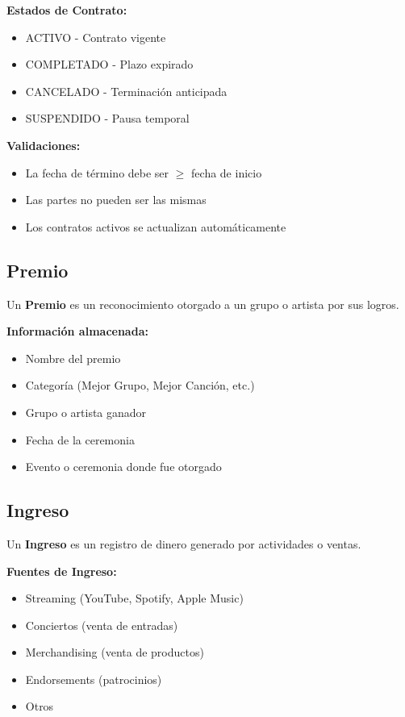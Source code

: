 \documentclass[12pt,a4paper,spanish,oneside]{report}
\begin{document}
\textbf{Estados de Contrato:}
\begin{itemize}
\item ACTIVO - Contrato vigente
\item COMPLETADO - Plazo expirado
\item CANCELADO - Terminación anticipada
\item SUSPENDIDO - Pausa temporal
\end{itemize}

\textbf{Validaciones:}
\begin{itemize}
\item La fecha de término debe ser $\geq$ fecha de inicio
\item Las partes no pueden ser las mismas
\item Los contratos activos se actualizan automáticamente
\end{itemize}

\subsection{Premio}

Un \textbf{Premio} es un reconocimiento otorgado a un grupo o artista por sus logros.

\textbf{Información almacenada:}
\begin{itemize}
\item Nombre del premio
\item Categoría (Mejor Grupo, Mejor Canción, etc.)
\item Grupo o artista ganador
\item Fecha de la ceremonia
\item Evento o ceremonia donde fue otorgado
\end{itemize}

\subsection{Ingreso}

Un \textbf{Ingreso} es un registro de dinero generado por actividades o ventas.

\textbf{Fuentes de Ingreso:}
\begin{itemize}
\item Streaming (YouTube, Spotify, Apple Music)
\item Conciertos (venta de entradas)
\item Merchandising (venta de productos)
\item Endorsements (patrocinios)
\item Otros
\end{itemize}
\end{document}
